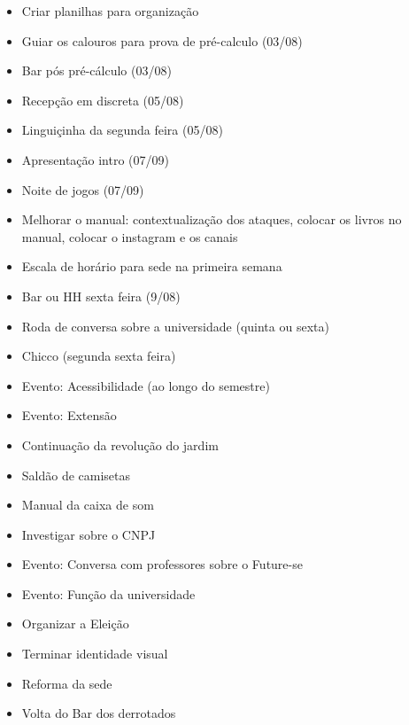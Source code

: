 \documentclass{ata-calico}
\begin{document}
\maketitle

\begin{itemize}
\item Criar planilhas para organização
\item Guiar os calouros para prova de pré-calculo (03/08) 
\item Bar pós pré-cálculo (03/08)
\item Recepção em discreta (05/08)
\item Linguiçinha da segunda feira (05/08)
\item Apresentação intro (07/09)
\item Noite de jogos (07/09)
\item Melhorar o manual: contextualização dos ataques, colocar os livros no manual, colocar o instagram e os canais
\item Escala de horário para sede na primeira semana
\item Bar ou HH sexta feira (9/08)
\item Roda de conversa sobre a universidade (quinta ou sexta)
\item Chicco (segunda sexta feira)
\end{itemize}

\begin{itemize}
\item Evento: Acessibilidade (ao longo do semestre)
\item Evento: Extensão
\item Continuação da revolução do jardim
\item Saldão de camisetas
\item Manual da caixa de som
\item Investigar sobre o CNPJ
\item Evento: Conversa com professores sobre o Future-se
\item Evento: Função da universidade
\item Organizar a Eleição
\item Terminar identidade visual
\item Reforma da sede
\item Volta do Bar dos derrotados

\end{itemize}
\end{document}
